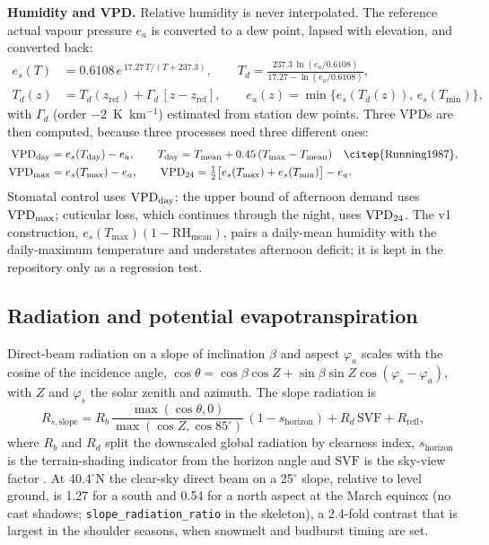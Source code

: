 \textbf{Humidity and VPD.} Relative humidity is never interpolated. The reference actual vapour pressure $e_a$ is converted to a dew point, lapsed with elevation, and converted back:
\begin{equation}\label{eq:dew}
\begin{aligned}
e_s(T)&=0.6108\,e^{\,17.27\,T/(T+237.3)},\qquad T_d=\frac{237.3\,\ln(e_a/0.6108)}{17.27-\ln(e_a/0.6108)},\\
T_d(z)&=T_d(z_{\text{ref}})+\Gamma_d\,[z-z_{\text{ref}}],\qquad e_a(z)=\min\{e_s(T_d(z)),\,e_s(T_{\min})\},
\end{aligned}
\end{equation}
with $\Gamma_d$ (order $-2$~K~km$^{-1}$) estimated from station dew points. Three VPDs are then computed, because three processes need three different ones:
\begin{equation}\label{eq:vpd}
\begin{aligned}
\VPD_{\text{day}}&=e_s(T_{\text{day}})-e_a,\qquad T_{\text{day}}=T_{\text{mean}}+0.45\,(T_{\max}-T_{\text{mean}})\quad\text{\citep{Running1987}},\\
\VPD_{\max}&=e_s(T_{\max})-e_a,\qquad \VPD_{24}=\tfrac12\big[e_s(T_{\max})+e_s(T_{\min})\big]-e_a.
\end{aligned}
\end{equation}
Stomatal control uses $\mathrm{VPD}_{\text{day}}$; the upper bound of afternoon demand uses $\mathrm{VPD}_{\max}$; cuticular loss, which continues through the night, uses $\mathrm{VPD}_{24}$. The v1 construction, $e_s(T_{\max})(1-\mathrm{RH}_{\text{mean}})$, pairs a daily-mean humidity with the daily-maximum temperature and understates afternoon deficit; it is kept in the repository only as a regression test.

\subsection{Radiation and potential evapotranspiration}
Direct-beam radiation on a slope of inclination $\beta$ and aspect $\varphi_a$ scales with the cosine of the incidence angle, $\cos\theta=\cos\beta\cos Z+\sin\beta\sin Z\cos(\varphi_s-\varphi_a)$, with $Z$ and $\varphi_s$ the solar zenith and azimuth. The slope radiation is
\begin{equation}\label{eq:rad}
R_{s,\text{slope}}=R_b\,\frac{\max(\cos\theta,0)}{\max(\cos Z,\cos85^\circ)}\,(1-s_{\text{horizon}})+R_d\,\mathrm{SVF}+R_{\text{refl}},
\end{equation}
where $R_b$ and $R_d$ split the downscaled global radiation by clearness index, $s_{\text{horizon}}$ is the terrain-shading indicator from the horizon angle and $\mathrm{SVF}$ is the sky-view factor \citep{Dozier1990}. At 40.4$^\circ$N the clear-sky direct beam on a 25$^\circ$ slope, relative to level ground, is 1.27 for a south and 0.54 for a north aspect at the March equinox (no cast shadows; \texttt{slope\_radiation\_ratio} in the skeleton), a 2.4-fold contrast that is largest in the shoulder seasons, when snowmelt and budburst timing are set.

